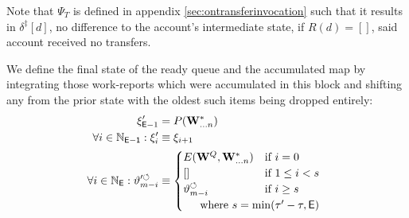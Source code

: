 Note that $\Psi_T$ is defined in appendix \ref{sec:ontransferinvocation} such that it results in $\delta^\ddagger[d]$, \ie no difference to the account's intermediate state, if $R(d) = []$, \ie said account received no transfers.

We define the final state of the ready queue and the accumulated map by integrating those work-reports which were accumulated in this block and shifting any from the prior state with the oldest such items being dropped entirely:
\begin{align}
  \accumulated'_{\mathsf{E} - 1} &= \srmap(\mathbf{W}^*_{\dots n}) \\
  \forall i \in \N_\mathsf{E - 1}: \accumulated'_{i} &\equiv \accumulated_{i + 1} \\
  \forall i \in \N_\mathsf{E} : \ready'^\circlearrowleft_{m - i} &\equiv \begin{cases}
    E(\mathbf{W}^Q, \mathbf{W}^*_{\dots n}) &\when i = 0 \\
    [] &\when 1 \le i < s \\
    \ready^\circlearrowleft_{m - i} &\when i \ge s\\
    \multicolumn{2}{l}{\quad\where s = \min(\tau' - \tau, \mathsf{E})}
  \end{cases}
\end{align}
